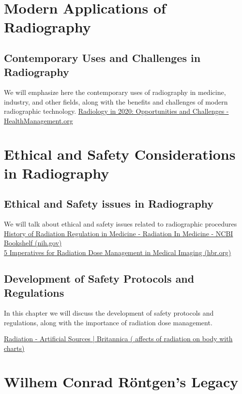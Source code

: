 \documentclass[a4paper,12pt]{report}
\begin{document}
\chapter{Modern Applications of Radiography}
\section{Contemporary Uses and Challenges in Radiography}
We will emphasize here the contemporary uses of radiography in medicine, industry, and other fields, along with the benefits and challenges of modern radiographic technology.
\href{https://healthmanagement.org/c/healthmanagement/issuearticle/radiology-in-2020-opportunities-and-challenges#:~:text=%E2%80%A2%20Radiological%20technology%20is%20shifting%20from%20a%20%E2%80%9Cdisruptive%E2%80%9D,In%20vitro%20diagnostics%20will%20change%20radiological%20screening%20policy.}{Radiology in 2020: Opportunities and Challenges - HealthManagement.org }


\chapter{Ethical and Safety Considerations in Radiography}

\section{Ethical and Safety issues in Radiography}
We will talk about ethical and safety issues related to radiographic procedures\\
\href{https://www.ncbi.nlm.nih.gov/books/NBK232703/}{History of Radiation Regulation in Medicine - Radiation In Medicine - NCBI Bookshelf (nih.gov)}\\
\href{https://hbr.org/sponsored/2022/10/5-imperatives-for-radiation-dose-management-in-medical-imaging}{5 Imperatives for Radiation Dose Management in Medical Imaging  (hbr.org)}
\section{Development of Safety Protocols and Regulations}
In this chapter we will discuss the development of safety protocols and regulations, along with the importance of radiation dose management.

\href{https://www.britannica.com/science/radiation/Artificial-sources}{Radiation - Artificial Sources | Britannica ( affects of radiation on body with charts)}

\chapter{Wilhem Conrad Röntgen's Legacy}
\end{document}
